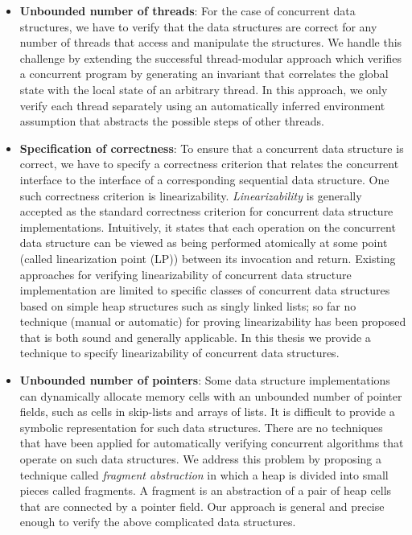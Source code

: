 \begin{itemize}
\item {\bf Unbounded number of threads}: For the case of concurrent data structures, we have to verify that the data structures are correct for any number of threads that access and manipulate the structures. We handle this challenge by extending the successful
thread-modular approach\cite{ThreadModular} which verifies a concurrent program by generating
an invariant that correlates the global state with the local state of an arbitrary thread. In this approach, we only verify each thread
separately using an automatically inferred environment assumption that
abstracts the possible steps of other threads.
\item {\bf Specification of correctness}: To ensure that a concurrent data structure is correct, we have to specify a correctness criterion that relates the concurrent interface to the interface of a corresponding sequential data structure.  One such correctness criterion is linearizability\cite{herlihy1990linearizability}. \emph{Linearizability} is generally accepted as the standard correctness criterion for concurrent data structure implementations. Intuitively, it states that each operation on the concurrent data structure can be viewed as being performed atomically at some point (called linearization point (LP)) between its invocation and return. Existing approaches for verifying linearizability of concurrent data structure implementation are limited to specific classes of concurrent data structures based on simple heap structures such as singly linked lists; so far no technique (manual or automatic) for proving linearizability has been proposed that is both sound and generally applicable. In this thesis we provide a technique to specify linearizability of concurrent data structures. 
\item {\bf Unbounded number of pointers}: Some data structure implementations can dynamically allocate memory cells with an unbounded number of pointer fields,  such as cells in skip-lists and arrays of lists. It is difficult to provide a symbolic representation for such data structures. There are no techniques that have been applied for automatically verifying concurrent algorithms that operate on such data structures. We address this problem by proposing a technique called \emph{fragment abstraction} in which a heap is divided into small pieces called fragments. A fragment is an abstraction
of a pair of heap cells that are connected by a pointer field. Our approach is general and precise enough to verify the above complicated data structures. 
\end{itemize}

